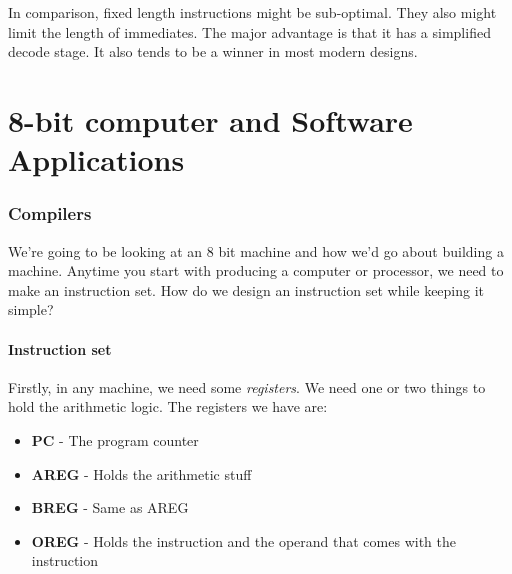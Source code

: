 \documentclass[11pt,a4paper,titlepage,dvipsnames,cmyk]{scrartcl}
\begin{document}
In comparison, fixed length instructions might be sub-optimal. They also
might limit the length of immediates. The major advantage is that it has
a simplified decode stage. It also tends to be a winner in most modern
designs.

\part{8-bit computer and Software Applications}
\section{Compilers}%
\label{sec:Compilers}
We're going to be looking at an 8 bit machine and how we'd go about
building a machine. Anytime you start with producing a computer or
processor, we need to make an instruction set. How do we design an
instruction set while keeping it simple?

\subsection{Instruction set}%
\label{sub:Instruction set}
Firstly, in any machine, we need some \textit{registers}. We need one or
two things to hold the arithmetic logic. The registers we have are:
\begin{itemize}
    \item \textbf{PC} - The program counter
    \item \textbf{AREG} - Holds the arithmetic stuff
    \item \textbf{BREG} - Same as AREG
    \item \textbf{OREG} - Holds the instruction and the operand that comes
        with the instruction
\end{itemize}
\end{document}
